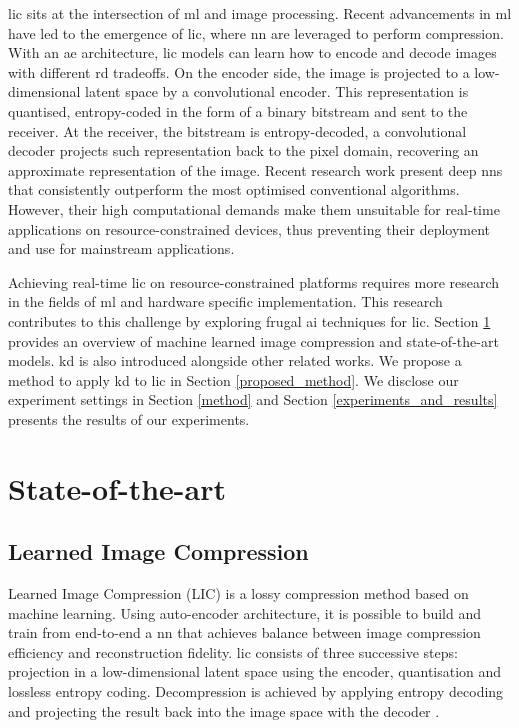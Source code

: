 \documentclass{article}
\begin{document}
\acrfull{lic} sits at the intersection of \acrfull{ml} and image processing. Recent advancements in \acrshort{ml} have led to the emergence of \acrshort{lic}, where \acrfull{nn} are leveraged to perform compression. With an \acrfull{ae} architecture, \acrshort{lic} models can learn how to encode and decode images with different \acrfull{rd} tradeoffs. On the encoder side, the image is projected to a low-dimensional latent space by a convolutional encoder. This representation is quantised, entropy-coded in the form of a binary bitstream and sent to the receiver. At the receiver, the bitstream is entropy-decoded, a convolutional decoder projects such representation back to the pixel domain, recovering an approximate representation of the image. Recent research work present deep \acrshort{nn}s that consistently outperform the most optimised conventional algorithms. However, their high computational demands make them unsuitable for real-time applications on resource-constrained devices, thus preventing their deployment and use for mainstream applications.

Achieving real-time \acrshort{lic} on resource-constrained platforms requires more research in the fields of \acrshort{ml} and hardware specific implementation. This research contributes to this challenge by exploring frugal \acrfull{ai} techniques for \acrshort{lic}. Section \ref{sota} provides an overview of machine learned image compression and state-of-the-art models. \acrfull{kd} is also introduced alongside other related works. We propose a method to apply \acrshort{kd} to \acrshort{lic} in Section \ref{proposed_method}. We disclose our experiment settings in Section \ref{method} and Section \ref{experiments_and_results} presents the results of our experiments.

\section{State-of-the-art}
\label{sota}

\subsection{Learned Image Compression}
Learned Image Compression (LIC) is a lossy compression method based on machine learning. Using auto-encoder architecture, it is possible to build and train from end-to-end a \acrshort{nn} that achieves balance between image compression efficiency and reconstruction fidelity. \acrshort{lic} consists of three successive steps: projection in a low-dimensional latent space using the encoder, quantisation and lossless entropy coding. Decompression is achieved by applying entropy decoding and projecting the result back into the image space with the decoder \cite{licmedium, licstanford}.
\end{document}
